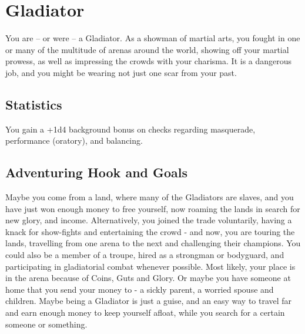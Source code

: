 \section{Gladiator}\label{background:gladiator}
You are -- or were -- a Gladiator.
As a showman of martial arts, you fought in one or many of the multitude of arenas around the world, showing off your martial prowess, as well as impressing the crowds with your charisma.
It is a dangerous job, and you might be wearing not just one scar from your past.

\subsection{Statistics}
You gain a +1d4 background bonus on checks regarding masquerade, performance (oratory), and balancing.

\subsection{Adventuring Hook and Goals}
Maybe you come from a land, where many of the Gladiators are slaves, and you have just won enough money to free yourself, now roaming the lands in search for new glory, and income.
Alternatively, you joined the trade voluntarily, having a knack for show-fights and entertaining the crowd - and now, you are touring the lands, travelling from one arena to the next and challenging their champions.
You could also be a member of a troupe, hired as a strongman or bodyguard, and participating in gladiatorial combat whenever possible.
Most likely, your place is in the arena because of Coins, Guts and Glory.
Or maybe you have someone at home that you send your money to - a sickly parent, a worried spouse and children.
Maybe being a Gladiator is just a guise, and an easy way to travel far and earn enough money to keep yourself afloat, while you search for a certain someone or something.
